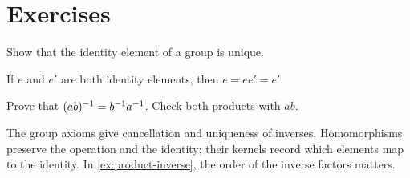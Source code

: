 \documentclass[../../main.tex]{subfiles}
\begin{document}
\section{Exercises}
\begin{problem}[Identity]
Show that the identity element of a group is unique.
\end{problem}
\begin{soln}
If $e$ and $e'$ are both identity elements, then $e=ee'=e'$.
\end{soln}

\begin{exercise}\label{ex:product-inverse}
Prove that $(ab)^{-1}=b^{-1} a^{-1}$. Check both products with $ab$.
\end{exercise}

\begin{recap}
The group axioms give cancellation and uniqueness of inverses.
Homomorphisms preserve the operation and the identity; their kernels
record which elements map to the identity. In \cref{ex:product-inverse},
the order of the inverse factors matters.
\end{recap}
\end{document}
